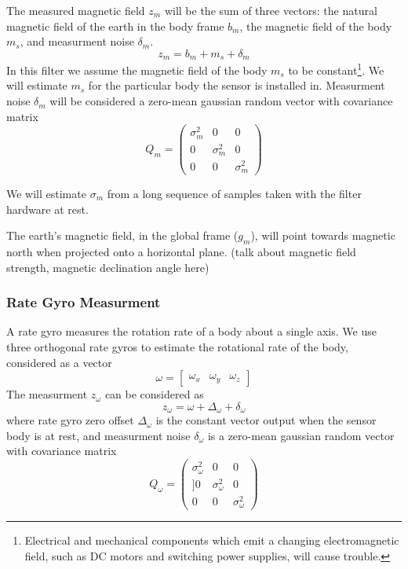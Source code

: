 \documentclass[12pt]{report}
\begin{document}
The measured magnetic field $z_m$ will be the sum of three vectors: the natural magnetic field of the earth in the body frame $b_m$, the magnetic field of the body $m_s$, and measurment noise $\delta_m$.
\begin{equation} \label{eq:zm}
  z_m = b_m + m_s + \delta_m
\end{equation}
In this filter we assume the magnetic field of the body $m_s$ to be constant\footnote{Electrical and mechanical components which emit a changing electromagnetic field, such as DC motors and switching power supplies, will cause trouble.}. We will estimate $m_s$ for the particular body the sensor is installed in. Measurment noise $\delta_m$ will be considered a zero-mean gaussian random vector with covariance matrix
\begin{equation} \label{eq:Qm}
  Q_m = \begin{pmatrix} \sigma_m^2 & 0 & 0 \\
	                      0 & \sigma_m^2 & 0 \\ 
	                      0 & 0 & \sigma_m^2 \end{pmatrix} 
\end{equation}

We will estimate $\sigma_m$ from a long sequence of samples taken with the filter hardware at rest.

The earth's magnetic field, in the global frame ($g_m$), will point towards magnetic north when projected onto a horizontal plane. (talk about magnetic field strength, magnetic declination angle here)


\subsubsection{Rate Gyro Measurment}

A rate gyro measures the rotation rate of a body about a single axis. We use three orthogonal rate gyros to estimate the rotational rate of the body, considered as a vector
\begin{equation} \label{eq:omega}
	\omega = \begin{bmatrix} \omega_x & \omega_y & \omega_z \end{bmatrix}
\end{equation}
The measurment $z_\omega$ can be considered as
\begin{equation} \label{eq:zomega}
	z_\omega = \omega + \Delta_\omega + \delta_\omega
\end{equation}
where rate gyro zero offset $\Delta_\omega$ is the constant vector output when the sensor body is at rest,
and measurment noise $\delta_\omega$ is a zero-mean gaussian random vector with covariance matrix
\begin{equation} \label{eq:Qomega}
	Q_\omega = \begin{pmatrix} \sigma_\omega^2 & 0 & 0 \\
	                  ]    0 & \sigma_\omega^2 & 0 \\ 
	                      0 & 0 & \sigma_\omega^2 \end{pmatrix} 
\end{equation}
\end{document}
